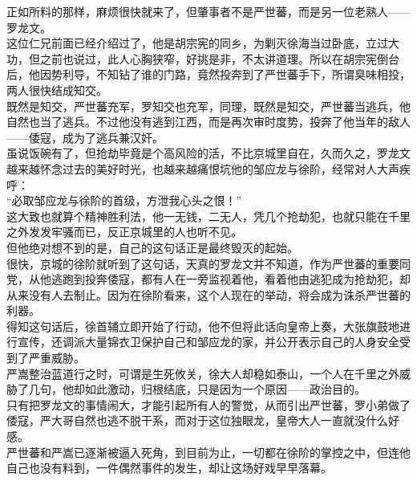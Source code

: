 \begin{multicols}{\theparacolNo}
正如所料的那样，麻烦很快就来了，但肇事者不是严世蕃，而是另一位老熟人——罗龙文。\\

这位仁兄前面已经介绍过了，他是胡宗宪的同乡，为剿灭徐海当过卧底，立过大功，但之前也说过，此人心胸狭窄，好挑是非，不太讲道理。所以在胡宗宪倒台后，他因势利导，不知钻了谁的门路，竟然投奔到了严世蕃手下，所谓臭味相投，两人很快结成知交。\\

既然是知交，严世蕃充军，罗知交也充军，同理，既然是知交，严世蕃当逃兵，他自然也当了逃兵。不过他没有逃到江西，而是再次审时度势，投奔了他当年的敌人——倭寇，成为了逃兵兼汉奸。\\

虽说饭碗有了，但抢劫毕竟是个高风险的活，不比京城里自在，久而久之，罗龙文越来越怀念过去的美好时光，也越来越痛恨坑他的邹应龙与徐阶，经常对人大声疾呼：\\

“必取邹应龙与徐阶的首级，方泄我心头之恨！”\\

这大致也就算个精神胜利法，他一无钱，二无人，凭几个抢劫犯，也就只能在千里之外发发牢骚而已，反正京城里的人也听不见。\\

但他绝对想不到的是，自己的这句话正是最终毁灭的起始。\\

很快，京城的徐阶就听到了这句话，天真的罗龙文并不知道，作为严世蕃的重要同党，从他逃跑到投奔倭寇，都有人在一旁监视着他，看着他由逃犯成为抢劫犯，却从来没有人去制止。因为在徐阶看来，这个人现在的举动，将会成为诛杀严世蕃的利器。\\

得知这句话后，徐首辅立即开始了行动，他不但将此话向皇帝上奏，大张旗鼓地进行宣传，还调派大量锦衣卫保护自己和邹应龙的家，并公开表示自己的人身安全受到了严重威胁。\\

严嵩整治蓝道行之时，可谓是生死攸关，徐大人却稳如泰山，一个人在千里之外威胁了几句，他却如此激动，归根结底，只是因为一个原因——政治目的。\\

只有把罗龙文的事情闹大，才能引起所有人的警觉，从而引出严世蕃，罗小弟做了倭寇，严大哥自然也逃不脱干系，而对于这位独眼龙，皇帝大人一直就没什么好感。\\

严世蕃和严嵩已逐渐被逼入死角，到目前为止，一切都在徐阶的掌控之中，但连他自己也没有料到，一件偶然事件的发生，却让这场好戏早早落幕。\\


\end{multicols}
